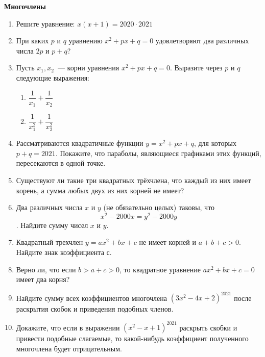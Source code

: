 \documentclass{article}
\begin{document}
\large
	

\begin{center}
\textbf{Многочлены}
\end{center}

\begin{enumerate}[label*=\protect\fbox{\arabic{enumi}}]

\item Решите уравнение:  $x(x + 1) = 2020\cdot2021$

\item При каких $p$ и $q$ уравнению  $x^2 + px + q = 0$  удовлетворяют два различных числа $2p$ и  $p + q$?

\item Пусть $x_1, x_2$~--- корни уравнения  $x^2 + px + q = 0$.  Выразите через $p$ и $q$ следующие выражения: 
\begin{enumerate}
	
	\item $\dfrac{1}{x_1} + \dfrac{1}{x_2}$
	
	\item $\dfrac{1}{x_1^2} + \dfrac{1}{x_2^2}$
	
\end{enumerate}

\item Рассматриваются квадратичные функции  $y = x^2 + px + q$,  для которых  $p + q = 2021$.
Покажите, что параболы, являющиеся графиками этих функций, пересекаются в одной точке.

\item Существуют ли такие три квадратных трёхчлена, что каждый из них имеет корень, а сумма любых двух из них корней не имеет?

\item Два различных числа $x$ и $y$ (не обязательно целых) таковы, что $$x^2 - 2000x = y^2 - 2000y$$.  Найдите сумму чисел $x$ и $y$.

\item Квадратный трехчлен  $y = ax^2 + bx + c$  не имеет корней и  $a  + b + c > 0$.  Найдите знак коэффициента $с$.

\item Верно ли, что если  $b > a + c > 0$,  то квадратное уравнение $ax^2 + bx + c = 0$ имеет два корня?

\item Найдите сумму всех коэффициентов многочлена  $(3x^2 - 4x + 2)^{2021}$ после раскрытия скобок и приведения подобных членов.

\item Докажите, что если в выражении  $(x^2 - x + 1)^{2021}$  раскрыть скобки и привести подобные слагаемые, то какой-нибудь коэффициент полученного многочлена будет отрицательным.


\end{enumerate}
\end{document}
